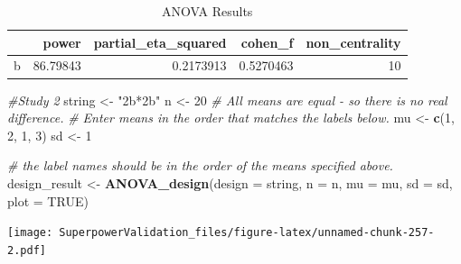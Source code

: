 \documentclass[]{book}
\newenvironment{Shaded}{\begin{snugshade}}{\end{snugshade}}
\newcommand{\CommentTok}[1]{\textcolor[rgb]{0.56,0.35,0.01}{\textit{#1}}}
\newcommand{\DataTypeTok}[1]{\textcolor[rgb]{0.13,0.29,0.53}{#1}}
\newcommand{\DecValTok}[1]{\textcolor[rgb]{0.00,0.00,0.81}{#1}}
\newcommand{\FloatTok}[1]{\textcolor[rgb]{0.00,0.00,0.81}{#1}}
\newcommand{\KeywordTok}[1]{\textcolor[rgb]{0.13,0.29,0.53}{\textbf{#1}}}
\newcommand{\NormalTok}[1]{#1}
\newcommand{\OperatorTok}[1]{\textcolor[rgb]{0.81,0.36,0.00}{\textbf{#1}}}
\newcommand{\OtherTok}[1]{\textcolor[rgb]{0.56,0.35,0.01}{#1}}
\newcommand{\StringTok}[1]{\textcolor[rgb]{0.31,0.60,0.02}{#1}}
\begin{document}
\begin{table}[!h]

\caption{\label{tab:unnamed-chunk-257}ANOVA Results}
\centering
\begin{tabular}{l|r|r|r|r}
\hline
  & power & partial\_eta\_squared & cohen\_f & non\_centrality\\
\hline
b & 86.79843 & 0.2173913 & 0.5270463 & 10\\
\hline
\end{tabular}
\end{table}

\begin{Shaded}
\begin{Highlighting}[]
\CommentTok{#Study 2}
\NormalTok{string <-}\StringTok{ "2b*2b"}
\NormalTok{n <-}\StringTok{ }\DecValTok{20}
\CommentTok{# All means are equal - so there is no real difference.}
\CommentTok{# Enter means in the order that matches the labels below.}
\NormalTok{mu <-}\StringTok{ }\KeywordTok{c}\NormalTok{(}\DecValTok{1}\NormalTok{, }\DecValTok{2}\NormalTok{, }\DecValTok{1}\NormalTok{, }\DecValTok{3}\NormalTok{) }
\NormalTok{sd <-}\StringTok{ }\DecValTok{1}

\CommentTok{# the label names should be in the order of the means specified above.}
\NormalTok{design_result <-}\StringTok{ }\KeywordTok{ANOVA_design}\NormalTok{(}\DataTypeTok{design =}\NormalTok{ string,}
                   \DataTypeTok{n =}\NormalTok{ n, }
                   \DataTypeTok{mu =}\NormalTok{ mu, }
                   \DataTypeTok{sd =}\NormalTok{ sd, }
                   \DataTypeTok{plot =} \OtherTok{TRUE}\NormalTok{)}
\end{Highlighting}
\end{Shaded}

\texttt{[image: SuperpowerValidation\_files/figure-latex/unnamed-chunk-257-2.pdf]}

\begin{Shaded}
\end{Shaded}
\end{document}
